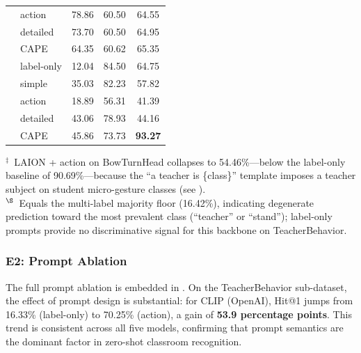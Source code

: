 \documentclass[symmetry,article,submit,pdftex,moreauthors]{Definitions/mdpi}
\begin{document}
\begin{table}[H]
\begin{tabular}{ll ccc}
 & action & 78.86 & 60.50 & 64.55 \\
 & detailed & 73.70 & 60.50 & 64.95 \\
 & CAPE & 64.35 & 60.62 & 65.35 \\
\addlinespace
\multirow{5}{*}{DFN-CLIP}
 & label-only & 12.04 & 84.50 & 64.75 \\
 & simple & 35.03 & 82.23 & 57.82 \\
 & action & 18.89 & 56.31 & 41.39 \\
 & detailed & 43.06 & 78.93 & 44.16 \\
 & CAPE & 45.86 & 73.73 & \textbf{93.27} \\
\bottomrule
\end{tabular}
\noindent\footnotesize $^{\ddagger}$~LAION + action on BowTurnHead collapses to 54.46\%---below the label-only baseline of 90.69\%---because the ``a teacher is \{class\}'' template imposes a teacher subject on student micro-gesture classes (see ).\\
$^{\S}$~Equals the multi-label majority floor (16.42\%), indicating degenerate prediction toward the most prevalent class (``teacher'' or ``stand''); label-only prompts provide no discriminative signal for this backbone on TeacherBehavior.
\end{table}

\subsubsection{E2: Prompt Ablation}
\label{sec:e2}

The full prompt ablation is embedded in .
On the TeacherBehavior sub-dataset, the effect of prompt design is substantial: for CLIP (OpenAI), Hit@1 jumps from 16.33\% (label-only) to 70.25\% (action), a gain of \textbf{53.9 percentage points}.
This trend is consistent across all five models, confirming that prompt semantics are the dominant factor in zero-shot classroom recognition.
\end{document}
